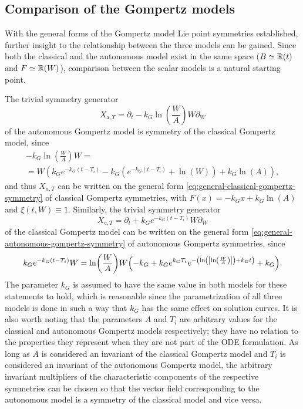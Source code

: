 \subsection{Comparison of the Gompertz models}

With the general forms of the Gompertz model Lie point symmetries established, further insight to the relationship between the three models can be gained.
Since both the classical and the autonomous model exist in the same space (\(B \simeq \mathbb{R}(t)\) and \(F \simeq \mathbb{R}(W)\)), comparison between the scalar models is a natural starting point.

The trivial symmetry generator
\begin{equation*}
  X_{\text{a},T} = \partial_t - k_G \ln\left(\frac{W}{A}\right) W \partial_W
\end{equation*}
of the autonomous Gompertz model is symmetry of the classical Gompertz model, since
\begin{multline*}
  -k_G \ln\left(\frac{W}{A}\right) W =\\= W \left(k_G e^{-k_G (t - T_i)} - k_G \left(e^{-k_G (t - T_i)} + \ln\left(W\right)\right) + k_G \ln\left(A\right)\right),
\end{multline*}
and thus \(X_{a,T}\) can be written on the general form \cref{eq:general-classical-gompertz-symmetry} of classical Gompertz symmetries, with \(F(x) = -k_G x + k_G \ln\left(A\right)\) and \(\xi(t, W) \equiv 1\).
Similarly, the trivial symmetry generator
\begin{equation*}
  X_{\text{c},T} = \partial_t + k_G e^{-k_G (t - T_i)} W \partial_W
\end{equation*}
of the classical Gompertz model can be written on the general form \cref{eq:general-autonomous-gompertz-symmetry} of autonomous Gompertz symmetries, since
\begin{equation*}
  k_G e^{-k_G (t - T_i)} W = \ln\left(\frac{W}{A}\right) W \left(-k_G + k_G e^{k_G T_i} e^{-\left(\ln\left(\abs{\ln\left(\frac{W}{A}\right)}\right) + k_G t\right)} + k_G\right). %
\end{equation*}
The parameter \(k_G\) is assumed to have the same value in both models for these statements to hold, which is reasonable since the parametrization of all three models is done in such a way that \(k_G\) has the same effect on solution curves.
It is also worth noting that the parameters \(A\) and \(T_i\) are arbitrary values for the classical and autonomous Gompertz models respectively; they have no relation to the properties they represent when they are not part of the ODE formulation.
As long as \(A\) is considered an invariant of the classical Gompertz model and \(T_i\) is considered an invariant of the autonomous Gompertz model, the arbitrary invariant multipliers of the characteristic components of the respective symmetries can be chosen so that the vector field corresponding to the autonomous model is a symmetry of the classical model and vice versa.

